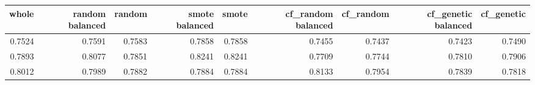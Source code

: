 \begin{tabular}{rrrrrrrrr}
\toprule

 whole &  random balanced &  random &  smote balanced &  smote &  cf\_random balanced &  cf\_random &  cf\_genetic balanced &  cf\_genetic \\
\midrule

0.7524 &           0.7591 &  0.7583 &          0.7858 & 0.7858 &              0.7455 &     0.7437 &               0.7423 &      0.7490 \\
0.7893 &           0.8077 &  0.7851 &          0.8241 & 0.8241 &              0.7709 &     0.7744 &               0.7810 &      0.7906 \\
0.8012 &           0.7989 &  0.7882 &          0.7884 & 0.7884 &              0.8133 &     0.7954 &               0.7839 &      0.7818 \\

\bottomrule
\end{tabular}

